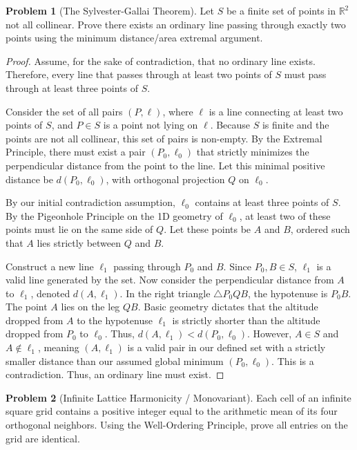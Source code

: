 \documentclass[11pt, a4paper]{article}
\theoremstyle{definition}
\newtheorem{problem}{Problem}
\theoremstyle{plain}
\begin{document}
\vspace{0.5cm}

\begin{problem}[The Sylvester-Gallai Theorem]
Let $S$ be a finite set of points in $\mathbb{R}^2$ not all collinear. Prove there exists an ordinary line passing through exactly two points using the minimum distance/area extremal argument.
\end{problem}

\begin{proof}
Assume, for the sake of contradiction, that no ordinary line exists. Therefore, every line that passes through at least two points of $S$ must pass through at least three points of $S$.

Consider the set of all pairs $(P, \ell)$, where $\ell$ is a line connecting at least two points of $S$, and $P \in S$ is a point not lying on $\ell$. Because $S$ is finite and the points are not all collinear, this set of pairs is non-empty.
By the Extremal Principle, there must exist a pair $(P_0, \ell_0)$ that strictly minimizes the perpendicular distance from the point to the line. Let this minimal positive distance be $d(P_0, \ell_0)$, with orthogonal projection $Q$ on $\ell_0$.

By our initial contradiction assumption, $\ell_0$ contains at least three points of $S$. By the Pigeonhole Principle on the 1D geometry of $\ell_0$, at least two of these points must lie on the same side of $Q$. Let these points be $A$ and $B$, ordered such that $A$ lies strictly between $Q$ and $B$.

Construct a new line $\ell_1$ passing through $P_0$ and $B$. Since $P_0, B \in S$, $\ell_1$ is a valid line generated by the set. Now consider the perpendicular distance from $A$ to $\ell_1$, denoted $d(A, \ell_1)$. 
In the right triangle $\triangle P_0 Q B$, the hypotenuse is $P_0 B$. The point $A$ lies on the leg $QB$. Basic geometry dictates that the altitude dropped from $A$ to the hypotenuse $\ell_1$ is strictly shorter than the altitude dropped from $P_0$ to $\ell_0$. 
Thus, $d(A, \ell_1) < d(P_0, \ell_0)$. However, $A \in S$ and $A \notin \ell_1$, meaning $(A, \ell_1)$ is a valid pair in our defined set with a strictly smaller distance than our assumed global minimum $(P_0, \ell_0)$. This is a contradiction. Thus, an ordinary line must exist.
\end{proof}

\vspace{0.5cm}

\begin{problem}[Infinite Lattice Harmonicity / Monovariant]
Each cell of an infinite square grid contains a positive integer equal to the arithmetic mean of its four orthogonal neighbors. Using the Well-Ordering Principle, prove all entries on the grid are identical.
\end{problem}
\end{document}
